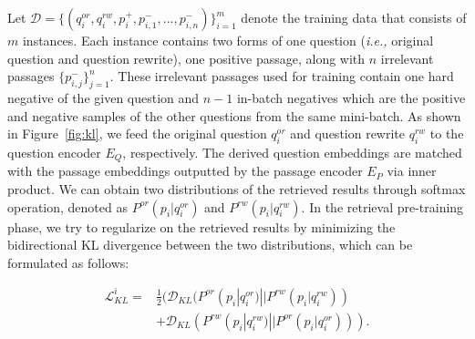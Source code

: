 Let $\mathcal{D} = \{(q_i^{or}, q_i^{rw}, p_i^+, p_{i,1}^-, ... ,  p_{i,n}^-)\}_{i=1}^m$ denote the training data that consists of $m$ instances. Each instance contains two forms of one question (\emph{i.e.,} original question and question rewrite), one positive passage, along with $n$ irrelevant passages $\{p_{i,j}^-\}_{j=1}^n$. These irrelevant passages used for training contain one hard negative of the given question and $n-1$ in-batch negatives which are the positive and negative samples of the other questions from the same mini-batch.
As shown in Figure~\ref{fig:kl}, we feed the original question $q_i^{or}$ and question rewrite $q_i^{rw}$ to the question encoder $E_Q$, respectively. The derived question embeddings are matched with the passage embeddings outputted by the passage encoder $E_P$ via inner product.
We can obtain two distributions of the retrieved results through softmax operation, denoted as $P^{or}(p_i|q_i^{or})$ and $P^{rw}(p_i|q_i^{rw})$. In the retrieval pre-training phase, we try to regularize on the retrieved results by minimizing the bidirectional KL divergence between the two distributions,
which can be formulated as follows:
\begin{small}
\begin{equation}%
\begin{aligned}
\mathcal{L}_{KL}^i 
= & \frac{1}{2}(\mathcal{D}_{KL}(P^{or}(p_i|q_i^{or}) || P^{rw}(p_i|q_i^{rw})) \\
& + \mathcal{D}_{KL}(P^{rw}(p_i|q_i^{rw}) || P^{or}(p_i|q_i^{or}))).
\end{aligned}
\end{equation}
\end{small}

